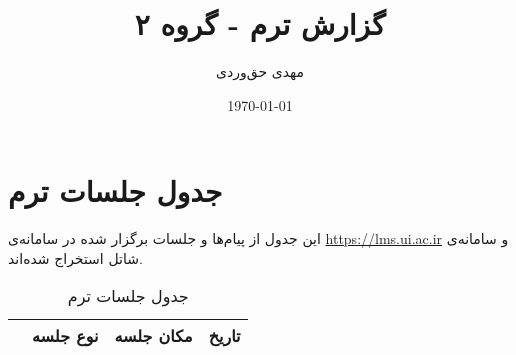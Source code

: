 \documentclass{article}
\title{گزارش ترم - گروه ۲}
\author{مهدی حق‌وردی}
\date{\today}
\newcounter{record}
\newcommand{\step}{\stepcounter{record}\arabic{record}}
\begin{document}
\maketitle

\section{جدول جلسات ترم}
این جدول از پیام‌ها و جلسات برگزار شده در سامانه‌ی 
\url{https://lms.ui.ac.ir}
و سامانه‌ی شاتل استخراج شده‌اند.

\begin{table}[H]
\begin{center}
\caption{جدول جلسات ترم}
\begin{tabular}{|c|c|c|c|}
\hline
\step &
نوع جلسه &
مکان جلسه &
تاریخ \\
\hline
\hline
\end{tabular}
\end{center}
\end{table}
\end{document}

